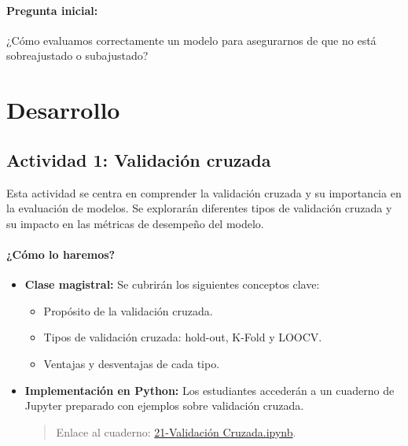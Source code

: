 \documentclass[a4,11pt]{aleph-notas}
\begin{document}
\paragraph{Pregunta inicial:} 
¿Cómo evaluamos correctamente un modelo para asegurarnos de que no está sobreajustado o subajustado?

\section*{Desarrollo}

\subsection*{Actividad 1: Validación cruzada}

Esta actividad se centra en comprender la validación cruzada y su importancia en la evaluación de modelos. Se explorarán diferentes tipos de validación cruzada y su impacto en las métricas de desempeño del modelo.

\paragraph{¿Cómo lo haremos?}  
\begin{itemize}[leftmargin=*]
    \item \textbf{Clase magistral:} Se cubrirán los siguientes conceptos clave:
    \begin{itemize}
        \item Propósito de la validación cruzada.
        \item Tipos de validación cruzada: hold-out, K-Fold y LOOCV.
        \item Ventajas y desventajas de cada tipo.
    \end{itemize}
    \item \textbf{Implementación en Python:} Los estudiantes accederán a un cuaderno de Jupyter preparado con ejemplos sobre validación cruzada.
    \begin{quote}
        Enlace al cuaderno: \href{https://colab.research.google.com/github/andres-merino/AprendizajeAutomaticoInicial-05-N0105/blob/main/2-Notebooks/21-Validacion-Cruzada.ipynb}{21-Validación Cruzada.ipynb}.
    \end{quote}
\end{itemize}
\end{document}
